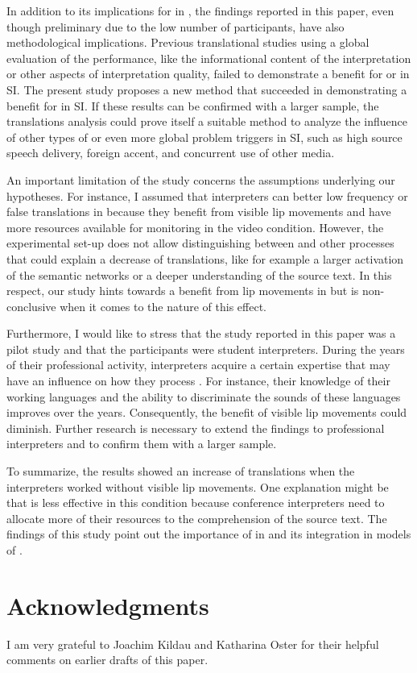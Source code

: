 \documentclass[output=paper]{LSP/langsci}
\begin{document}
In addition to its implications for  in , the findings reported in this paper, even though preliminary due to the low number of participants, have also methodological implications. Previous translational studies using a global evaluation of the  performance, like the informational content of the interpretation or other aspects of interpretation quality, failed to demonstrate a benefit for  or  in SI. The present study proposes a new method that succeeded in demonstrating a benefit for  in SI. If these results can be confirmed with a larger sample, the  translations analysis could prove itself a suitable method to analyze the influence of other types of  or even more global problem triggers in SI, such as high source speech delivery, foreign accent, and concurrent use of other media. 

An important limitation of the study concerns the assumptions underlying our hypotheses. For instance, I assumed that interpreters can better  low frequency or false  translations in  because they benefit from visible lip movements and have more resources available for monitoring in the video condition. However, the experimental set-up does not allow distinguishing between  and other processes that could explain a decrease of  translations, like for example a larger activation of the semantic networks or a deeper understanding of the source text. In this respect, our study hints towards a benefit from lip movements in  but is non-conclusive when it comes to the nature of this effect.

Furthermore, I would like to stress that the study reported in this paper was a pilot study and that the participants were student interpreters. During the years of their professional activity, interpreters acquire a certain expertise that may have an influence on how they process . For instance, their knowledge of their working languages and the ability to discriminate the sounds of these languages improves over the years. Consequently, the benefit of visible lip movements could diminish. Further research is necessary to extend the findings to professional interpreters and to confirm them with a larger sample. 

To summarize, the results showed an increase of  translations when the interpreters worked without visible lip movements. One explanation might be that  is less effective in this condition because conference interpreters need to allocate more of their resources to the comprehension of the source text. The findings of this study point out the importance of  in  and its integration in models of .

\section*{Acknowledgments}

I am very grateful to Joachim Kildau and Katharina Oster for their helpful comments on earlier drafts of this paper.

\printbibliography[heading=subbibliography,notkeyword=this]
\end{document}
